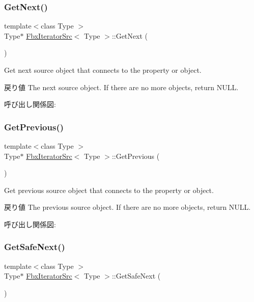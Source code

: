 \subsubsection{\texorpdfstring{Get\+Next()}{GetNext()}}
{\footnotesize\ttfamily template$<$class Type $>$ \\
Type$\ast$ \hyperlink{class_fbx_iterator_src}{Fbx\+Iterator\+Src}$<$ Type $>$\+::Get\+Next (\begin{DoxyParamCaption}{ }\end{DoxyParamCaption})}

Get next source object that connects to the property or object. \begin{DoxyReturn}{戻り値}
The next source object. If there are no more objects, return N\+U\+LL. 
\end{DoxyReturn}
呼び出し関係図\+:
\mbox{\label{class_fbx_iterator_src_a8b7703e63be49c3210f5a71946437027}} 
\subsubsection{\texorpdfstring{Get\+Previous()}{GetPrevious()}}
{\footnotesize\ttfamily template$<$class Type $>$ \\
Type$\ast$ \hyperlink{class_fbx_iterator_src}{Fbx\+Iterator\+Src}$<$ Type $>$\+::Get\+Previous (\begin{DoxyParamCaption}{ }\end{DoxyParamCaption})}

Get previous source object that connects to the property or object. \begin{DoxyReturn}{戻り値}
The previous source object. If there are no more objects, return N\+U\+LL. 
\end{DoxyReturn}
呼び出し関係図\+:
\mbox{\label{class_fbx_iterator_src_a530db83b2a4c20190bcdc7b7a9af2811}} 
\subsubsection{\texorpdfstring{Get\+Safe\+Next()}{GetSafeNext()}}
{\footnotesize\ttfamily template$<$class Type $>$ \\
Type$\ast$ \hyperlink{class_fbx_iterator_src}{Fbx\+Iterator\+Src}$<$ Type $>$\+::Get\+Safe\+Next (\begin{DoxyParamCaption}{ }\end{DoxyParamCaption})}


